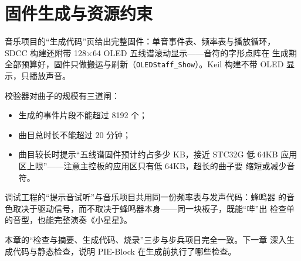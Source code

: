 \section{固件生成与资源约束}

音乐项目的“生成代码”页给出完整固件：单音事件表、频率表与播放循环，
SDCC 构建还附带 128$\times$64 OLED 五线谱滚动显示——音符的字形点阵在
生成期全部预算好，固件只做搬运与刷新（\texttt{OLEDStaff\_Show}）。Keil
构建不带 OLED 显示，只播放声音。

校验器对曲子的规模有三道闸：

\begin{itemize}
  \item 生成的事件片段不能超过 8192 个；
  \item 曲目总时长不能超过 20 分钟；
  \item 曲目较长时提示“五线谱固件预计约占多少 KB，接近 STC32G 低 64KB
        应用区上限”——注意主控板的应用区只有低 64KB，超长的曲子要
        缩短或减少音符。
\end{itemize}

\begin{remark}
调试工程的“提示音试听”与音乐项目共用同一份频率表与发声代码：蜂鸣器
的音色取决于驱动信号，而不取决于蜂鸣器本身——同一块板子，既能“哔”出
检查单的音型，也能完整演奏《小星星》。
\end{remark}

本章的“检查与摘要、生成代码、烧录”三步与步兵项目完全一致。下一章
深入生成代码与静态检查，说明 PIE-Block 在生成前执行了哪些检查。

